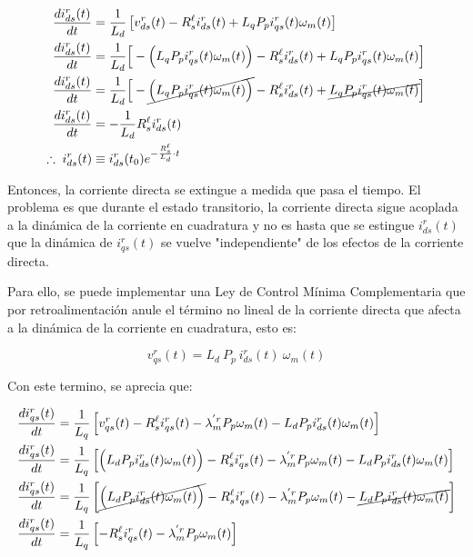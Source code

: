 \documentclass[blue,fullpaper]{ludusofficial}  %
\begin{document}
\begin{enumerate}
    \begin{align*}
    \frac{di_{ds}^{r}(t)}{dt} & = \frac{1}{L_{d}} \left[v_{ds}^{r}(t) - R_{s}^{\ell} i_{ds}^{r}(t) + L_{q}P_{p} i_{qs}^{r}(t) \omega_{m}(t) \right]
    \\
    \frac{di_{ds}^{r}(t)}{dt} & = \frac{1}{L_{d}} \Big[ - \Big(  L_{q}P_{p} i_{qs}^{r}(t) \omega_{m}(t) \Big) - R_{s}^{\ell} i_{ds}^{r}(t) + L_{q}P_{p} i_{qs}^{r}(t) \omega_{m}(t) \Big]
    \\
    \frac{di_{ds}^{r}(t)}{dt} & = \frac{1}{L_{d}} \Big[ - \cancel{ \Big(  L_{q}P_{p} i_{qs}^{r}(t) \omega_{m}(t) \Big) } - R_{s}^{\ell} i_{ds}^{r}(t) + \cancel{ L_{q}P_{p} i_{qs}^{r}(t) \omega_{m}(t)  }\Big]  \\
    \frac{di_{ds}^{r}(t)}{dt} & = -\frac{1}{L_{d}} R_{s}^{\ell} i_{ds}^{r}(t) \\
     \therefore \; i_{ds}^{r}(t)  & \equiv i_{ds}^{r}(t_0) e^{ -\frac{ R_{s}^{\ell} }{L_{d}} \cdot t  }
    \end{align*}

    Entonces, la corriente directa se extingue a medida que pasa el tiempo. El problema es que durante el estado transitorio, la corriente directa sigue acoplada a la dinámica de la corriente en cuadratura y no es hasta que se estingue $i_{ds}^{r}(t)$ que la dinámica de $i_{qs}^{r}(t)$ se vuelve "independiente" de los efectos de la corriente directa.

    Para ello, se puede implementar una Ley de Control Mínima Complementaria que por retroalimentación anule el término no lineal de la corriente directa que afecta a la dinámica de la corriente en cuadratura, esto es:

    \begin{equation}
\label{eq:ley-complementaria}
        v_{qs}^{r}(t) =   L_{d} \ P_{p} \ i_{ds}^{r}(t) \ \omega_{m}(t)
    \end{equation}

    Con este termino, se aprecia que:

    \begin{align*}
        \frac{di_{qs}^{r}(t)}{dt}  & = \frac{1}{L_{q} } \left[ v_{qs}^{r}(t) - R_{s}^{\ell} i_{qs}^{r}(t) - \lambda_{m}^{'r} P_{p}  \omega_{m}(t) -  L_{d} P_{p} i_{ds}^{r}(t) \omega_{m}(t)  \right]
        \\
        \frac{di_{qs}^{r}(t)}{dt}  & = \frac{1}{L_{q} } \left[ \Big( L_{d} P_{p} i_{ds}^{r}(t) \omega_{m}(t) \Big) - R_{s}^{\ell} i_{qs}^{r}(t) - \lambda_{m}^{'r} P_{p}  \omega_{m}(t) -  L_{d} P_{p} i_{ds}^{r}(t) \omega_{m}(t)  \right]
        \\
        \frac{di_{qs}^{r}(t)}{dt}  & = \frac{1}{L_{q} } \left[ \cancel{ \Big( L_{d} P_{p} i_{ds}^{r}(t) \omega_{m}(t) \Big) } - R_{s}^{\ell} i_{qs}^{r}(t) - \lambda_{m}^{'r} P_{p}  \omega_{m}(t) - \cancel{  L_{d} P_{p} i_{ds}^{r}(t) \omega_{m}(t) }  \right]\\
        \frac{di_{qs}^{r}(t)}{dt}  & = \frac{1}{L_{q} } \left[ - R_{s}^{\ell} i_{qs}^{r}(t) - \lambda_{m}^{'r} P_{p}  \omega_{m}(t)  \right]
    \end{align*}


\end{enumerate}
\end{document}

